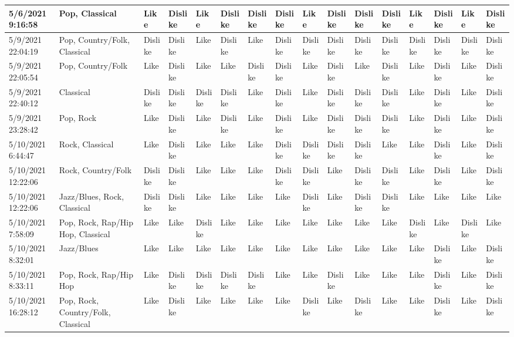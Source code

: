 \begin{table}
\begin{tabular}{|l|l|l|l|l|l|l|l|l|l|l|l|l|l|l|l|}
        5/6/2021 9:16:58 & Pop, Classical & Like & Dislike & Like & Dislike & Dislike & Dislike & Like & Dislike & Dislike & Dislike & Like & Dislike & Like & Dislike \\ \hline
        5/9/2021 22:04:19 & Pop, Country/Folk, Classical & Dislike & Dislike & Like & Dislike & Like & Dislike & Dislike & Dislike & Dislike & Dislike & Dislike & Dislike & Dislike & Dislike \\ \hline
        5/9/2021 22:05:54 & Pop, Country/Folk & Like & Dislike & Like & Like & Dislike & Dislike & Like & Dislike & Like & Dislike & Like & Dislike & Like & Dislike \\ \hline
        5/9/2021 22:40:12 & Classical & Dislike & Dislike & Dislike & Dislike & Like & Dislike & Like & Dislike & Dislike & Dislike & Like & Dislike & Like & Dislike \\ \hline
        5/9/2021 23:28:42 & Pop, Rock & Like & Dislike & Like & Dislike & Like & Dislike & Like & Dislike & Dislike & Dislike & Like & Dislike & Like & Dislike \\ \hline
        5/10/2021 6:44:47 & Rock, Classical & Like & Dislike & Like & Like & Like & Dislike & Dislike & Dislike & Dislike & Like & Like & Dislike & Like & Dislike \\ \hline
        5/10/2021 12:22:06 & Rock, Country/Folk & Dislike & Dislike & Like & Like & Like & Dislike & Dislike & Like & Dislike & Dislike & Like & Dislike & Like & Dislike \\ \hline
        5/10/2021 12:22:06 & Jazz/Blues, Rock, Classical & Dislike & Dislike & Like & Like & Like & Like & Dislike & Like & Dislike & Dislike & Like & Like & Like & Like \\ \hline
        5/10/2021 7:58:09 & Pop, Rock, Rap/Hip Hop, Classical & Like & Like & Dislike & Like & Like & Like & Like & Like & Like & Like & Dislike & Like & Dislike & Like \\ \hline
        5/10/2021 8:32:01 & Jazz/Blues & Like & Like & Like & Like & Like & Like & Like & Like & Like & Like & Like & Dislike & Like & Dislike \\ \hline
        5/10/2021 8:33:11 & Pop, Rock, Rap/Hip Hop & Like & Dislike & Dislike & Dislike & Dislike & Like & Like & Dislike & Like & Like & Like & Dislike & Like & Dislike \\ \hline
        5/10/2021 16:28:12 & Pop, Rock, Country/Folk, Classical & Like & Dislike & Like & Like & Like & Like & Dislike & Like & Dislike & Like & Like & Dislike & Like & Dislike \\ \hline

\end{tabular}
\end{table}
